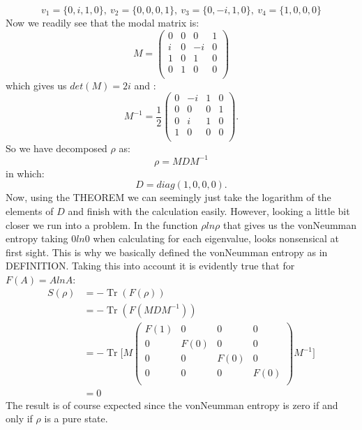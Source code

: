 \begin{equation}
v_1=\{0,i,1,0\},\:  v_2=\{0,0,0,1\},\:  v_3= \{0,-i,1,0\},\:  v_4= \{1,0,0,0\}
\end{equation}
Now we readily see that the modal matrix is:
\begin{equation}
M=
\left( \begin{array}{cccc}
 0 & 0 & 0 & 1 \\
 i & 0 & -i & 0 \\
 1 & 0 & 1 & 0 \\
 0 & 1 & 0 & 0 \\
\end{array}
\right)
\end{equation}
which gives us $det(M)=2i$ and : 
\begin{equation}
M^{-1}=\frac{1}{2}
\left( \begin{array}{cccc}
 0 & -i & 1 & 0 \\
 0 & 0 & 0 & 1 \\
 0 & i & 1 & 0 \\
 1 & 0 & 0 & 0 \\
\end{array}
\right).
\end{equation}
So we have decomposed $\rho$ as:
\begin{equation}
\rho=MDM^{-1}
\end{equation}
in which:
\begin{equation}
D=diag(1,0,0,0).
\label{diag}
\end{equation}
Now, using the THEOREM we can seemingly just take the logarithm of the elements of $D$ and finish with the calculation easily. However, looking a little bit closer we run into a problem. In the function $\rho ln \rho$ that gives us the vonNeumman entropy taking $0ln0$ when calculating for each eigenvalue, looks nonsensical at first sight. This is why we basically defined the vonNeumman entropy as in DEFINITION. Taking this into account it is evidently true that for $F(A)=AlnA$:
\begin{align}
S(\rho) &= -\operatorname{Tr}(F(\rho)) \nonumber \\[0.5em]
&= -\operatorname{Tr}(F(MDM^{-1})) \nonumber \\[0.5em]
&=-\operatorname{Tr}\Bigg[
M
\left( \begin{array}{cccc}
 F(1) & 0 & 0 & 0 \\
 0 & F(0) & 0 & 0 \\
 0 & 0 & F(0) & 0 \\
 0 & 0 & 0 & F(0) \\
\end{array}
\right)
M^{-1}
\Bigg]
\nonumber\\[0.5em]
&=0
\end{align}  
The result is of course expected since the vonNeumman entropy is zero if and only if $\rho$ is a pure state.
